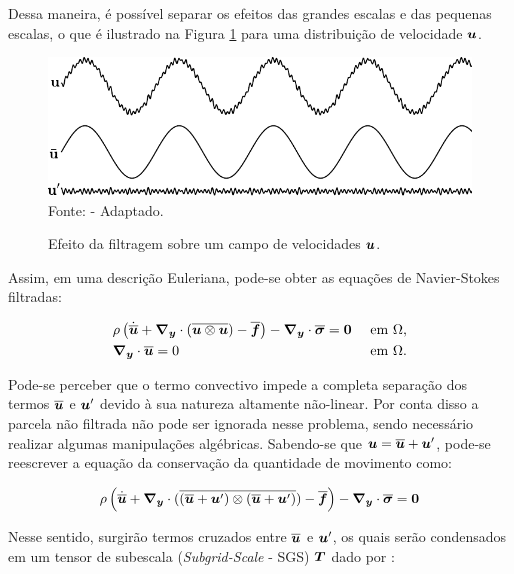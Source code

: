 Dessa maneira, é possível separar os efeitos das grandes escalas e das pequenas escalas, o que é ilustrado na Figura \ref{fig:EfeitoFiltragem} para uma distribuição de velocidade $\boldsymbol{u}$.

\begin{figure}[h!]
    \centering
    \caption{Efeito da filtragem sobre um campo de velocidades $\boldsymbol{u}$.}
    \includegraphics[width=.75\linewidth]{Figuras/efeito_filtragem.pdf}
    \\Fonte:  - Adaptado.
    \label{fig:EfeitoFiltragem}
\end{figure}

Assim, em uma descrição Euleriana, pode-se obter as equações de Navier-Stokes filtradas:

\begin{subequations}
    \begin{align}
         & \rho\left({\dot{\overline{\boldsymbol{u}}}+\boldsymbol{\nabla_y}\cdot(\overline{\boldsymbol{u}\otimes\boldsymbol{u}})-\overline{\boldsymbol{f}}}\right)-\boldsymbol{\nabla_y}\cdot\overline{\boldsymbol{\sigma}}=\boldsymbol{0} &  & \text{ em }\Omega\text{,} \\
         & \boldsymbol{\nabla_y}\cdot\overline{\boldsymbol{u}}=0                                                                                      &  & \text{ em }\Omega\text{.}
    \end{align}
\end{subequations}

Pode-se perceber que o termo convectivo impede a completa separação dos termos $\overline{\boldsymbol{u}}$ e $\boldsymbol{u}'$ devido à sua natureza altamente não-linear. Por conta disso a parcela não filtrada não pode ser ignorada nesse problema, sendo necessário realizar algumas manipulações algébricas. Sabendo-se que $\boldsymbol{u}=\overline{\boldsymbol{u}}+\boldsymbol{u}'$, pode-se reescrever a equação da conservação da quantidade de movimento como:

\begin{equation}
    \rho\left({\dot{\overline{\boldsymbol{u}}}+\boldsymbol{\nabla_y}\cdot(\overline{(\overline{\boldsymbol{u}}+\boldsymbol{u}')\otimes(\overline{\boldsymbol{u}}+\boldsymbol{u}')})-\overline{\boldsymbol{f}}}\right)-\boldsymbol{\nabla_y}\cdot\overline{\boldsymbol{\sigma}}=\boldsymbol{0}
\end{equation}

Nesse sentido, surgirão termos cruzados entre $\overline{\boldsymbol{u}}$ e $\boldsymbol{u}'$, os quais serão condensados em um tensor de subescala (\textit{Subgrid-Scale} - SGS) $\boldsymbol{T}$ dado por \cite{piomelli1999large,hughes2000large}:

